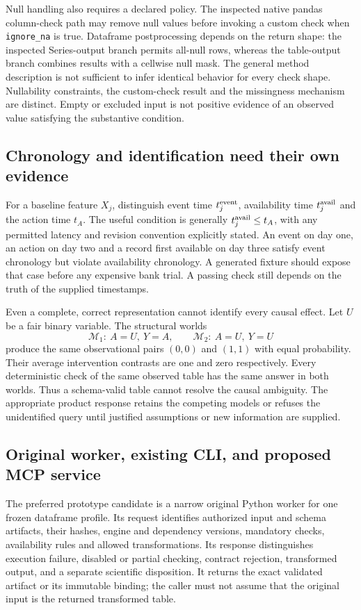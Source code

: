 Null handling also requires a declared policy. The inspected native pandas
column-check path may remove null values before invoking a custom check when
\texttt{ignore\_na} is true. Dataframe postprocessing depends on the return
shape: the inspected Series-output branch permits all-null rows, whereas the
table-output branch combines results with a cellwise null mask. The general
method description is not sufficient to infer identical behavior for every
check shape. Nullability constraints, the custom-check result and the missingness
mechanism are distinct. Empty or excluded input is not positive evidence of
an observed value satisfying the substantive condition.
\citep{exec24_pandera_source}

\subsection{Chronology and identification need their own evidence}
For a baseline feature $X_j$, distinguish event time $t_j^{\rm event}$,
availability time $t_j^{\rm avail}$ and the action time $t_A$. The useful
condition is generally $t_j^{\rm avail}\leq t_A$, with any permitted latency
and revision convention explicitly stated. An event on day one, an action on
day two and a record first available on day three satisfy event chronology
but violate availability chronology. A generated fixture should expose that
case before any expensive bank trial. A passing check still depends on the
truth of the supplied timestamps.~\citep{exec24_pandera_reference}

Even a complete, correct representation cannot identify every causal effect.
Let $U$ be a fair binary variable. The structural worlds
\begin{equation}
 \mathcal M_1:\ A=U,\ Y=A,
 \qquad
 \mathcal M_2:\ A=U,\ Y=U
\end{equation}
produce the same observational pairs $(0,0)$ and $(1,1)$ with equal probability.
Their average intervention contrasts are one and zero respectively. Every
deterministic check of the same observed table has the same answer in both
worlds. Thus a schema-valid table cannot resolve the causal ambiguity.
The appropriate product response retains the competing models or refuses the
unidentified query until justified assumptions or new information are supplied.
\citep{exec24_pandera_reference}

\subsection{Original worker, existing CLI, and proposed MCP service}
The preferred prototype candidate is a narrow original Python worker for one
frozen dataframe profile. Its request identifies authorized input and schema
artifacts, their hashes, engine and dependency versions, mandatory checks,
availability rules and allowed transformations. Its response distinguishes
execution failure, disabled or partial checking, contract rejection, transformed
output, and a separate scientific disposition. It returns the exact validated
artifact or its immutable binding; the caller must not assume that the original
input is the returned transformed table.

